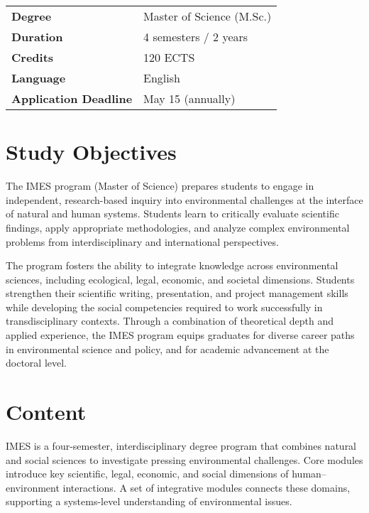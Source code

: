 \documentclass[
  letterpaper,
  10pt,
  openany]{book}
\begin{document}

\begin{longtable}[]{@{}ll@{}}
\toprule\noalign{}
\endhead
\bottomrule\noalign{}
\endlastfoot
\textbf{Degree} & Master of Science (M.Sc.) \\
\textbf{Duration} & 4 semesters / 2 years \\
\textbf{Credits} & 120 ECTS \\
\textbf{Language} & English \\
\textbf{Application Deadline} & May 15 (annually) \\
\end{longtable}

\section*{Study Objectives}\label{study-objectives}


The IMES program (Master of Science) prepares students to engage in
independent, research-based inquiry into environmental challenges at the
interface of natural and human systems. Students learn to critically
evaluate scientific findings, apply appropriate methodologies, and
analyze complex environmental problems from interdisciplinary and
international perspectives.

The program fosters the ability to integrate knowledge across
environmental sciences, including ecological, legal, economic, and
societal dimensions. Students strengthen their scientific writing,
presentation, and project management skills while developing the social
competencies required to work successfully in transdisciplinary
contexts. Through a combination of theoretical depth and applied
experience, the IMES program equips graduates for diverse career paths
in environmental science and policy, and for academic advancement at the
doctoral level.

\section*{Content}\label{content}


IMES is a four-semester, interdisciplinary degree program that combines
natural and social sciences to investigate pressing environmental
challenges. Core modules introduce key scientific, legal, economic, and
social dimensions of human--environment interactions. A set of
integrative modules connects these domains, supporting a systems-level
understanding of environmental issues.
\end{document}
